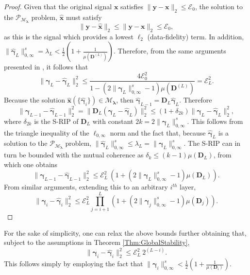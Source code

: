 \documentclass[10pt,journal]{IEEEtran}
\def\x{{\mathbf x}}
\def\y{{\mathbf y}}
\def\D{{\mathbf D}}
\def\M{{\mathcal{M}}}
\def\P{{\mathcal{P}}}
\def\gama{{\boldsymbol \gamma}}
\def\lamda{{\boldsymbol \lambda}}
\def\Loi{{\ell_{0,\infty}}}
\def\PM{{\P_{\M_\lamda}}}
\theoremstyle{plain}
\theoremstyle{definition}
\begin{document}
\begin{proof}
	Given that the original signal $\x$ satisfies $\|\y-\x\|_2\leq \mathcal{E}_0$,  the solution to the $\PM$ problem, $\hat{\x}$ must satisfy 
	\begin{equation}
	\|\y-\hat{\x}\|_2\leq \|\y- \x \|_2\leq \mathcal{E}_0,
	\end{equation}
	as this is the signal which provides a lowest $\ell_2$ (data-fidelity) term. In addition, $\|\hat{\gama}_L\|^s_{0,\infty} = \lambda_L < \frac{1}{2}(1+\frac{1}{\mu(\D^{(L)})}) $. Therefore, from the same arguments presented in \cite{WorkingLocallyThinkingGlobally}, it follows that
	\begin{equation}
	\|\gama_L-\hat{\gama}_L\|_2^2\leq \frac{4\mathcal{E}_0^2}{1-(2\|\gama_L\|^s_{0,\infty}-1)\mu(\D^{(L)})} = \mathcal{E}^2_L.
	\end{equation}
	Because the solution $\hat{\x}(\{\hat{\gama}_i\})\in\M_\lamda$, then $\hat{\gama}_{L-1} = \D_L \hat{\gama}_L$. Therefore
	\begin{equation}
	\|\gama_{L-1}-\hat{\gama}_{L-1}\|_2^2 = \|\D_L (\gama_{L}-\hat{\gama}_{L})\|_2^2 \leq (1+\delta_{2k})\|\gama_{L}-\hat{\gama}_{L}\|_2^2,
	\end{equation}
	where $\delta_{2k}$ is the S-RIP of $\D_L$ with constant $2k = 2\|\gama_L\|^s_{0,\infty}$. This follows from the triangle inequality of the $\Loi$ norm and the fact that, because $\hat{\gama}_L$ is a solution to the $\PM$ problem, $\|\hat{\gama}_L\|^s_{0,\infty} \leq \lambda_L = \|{\gama}_L\|^s_{0,\infty}$. The S-RIP can in turn be bounded with the mutual coherence \cite{WorkingLocallyThinkingGlobally} as $\delta_k \leq (k-1) \mu(\D_L)$, from which one obtains
	\begin{equation}
	\|\gama_{L-1}-\hat{\gama}_{L-1}\|_2^2 \leq \mathcal{E}^2_L\ (1+(2\|\gama_L\|^s_{0,\infty}-1)\mu(\D_L)).
	\end{equation}
	From similar arguments, extending this to an arbitrary $i^{th}$ layer, 
	\begin{equation}
	\| \gama_i- \hat{\gama}_i \|_2^2 \leq \mathcal{E}^2_L \prod_{j=i+1}^{L} (1 + (2\|\gama_j\|^s_{0,\infty} -1)\mu(\D_{j})).
	\end{equation}
\end{proof}

For the sake of simplicity, one can relax the above bounds further obtaining that, subject to the assumptions in Theorem \ref{Thm:GlobalStability}, 
\begin{equation} \label{Eq:DCPEStability_simple}
\| \gama_i- \hat{\gama}_i \|_2^2 \leq \mathcal{E}^2_L\ 2^{(L-i)}.
\end{equation}
This follows simply by employing the fact that $\| \gama_i \|^s_{0,\infty} < \frac{1}{2} \left( 1 + \frac{1}{\mu(\D_i)} \right)$.
\end{document}

